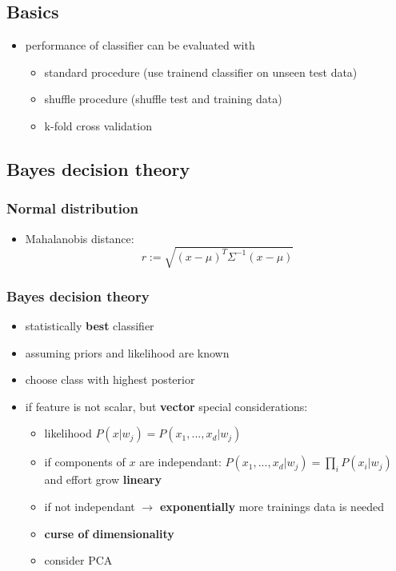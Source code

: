 \documentclass[11pt]{article}
\begin{document}
\subsection{Basics}
\label{sec-9-1}
\begin{itemize}
\item performance of classifier can be evaluated with
\begin{itemize}
\item standard procedure (use trainend classifier on unseen test data)
\item shuffle procedure  (shuffle test and training data)
\item k-fold cross validation
\end{itemize}
\end{itemize}
\subsection{Bayes decision theory}
\label{sec-9-2}
\subsubsection{Normal distribution}
\label{sec-9-2-1}
\begin{itemize}
\item Mahalanobis distance:
      \[ r:= \sqrt{(x-\mu)^T\Sigma^{-1}(x-\mu)} \]
\end{itemize}

\subsubsection{Bayes decision theory}
\label{sec-9-2-2}
\begin{itemize}
\item statistically \textbf{best} classifier
\item assuming priors and likelihood are known
\item choose class with highest posterior
\item if feature is not scalar, but \textbf{vector} special considerations:
\begin{itemize}
\item likelihood $P(x|w_j)=P(x_1,...,x_d|w_j)$
\item if components of $x$ are independant: $P(x_1,...,x_d|w_j)=\prod_i P(x_i|w_j)$
and effort grow \textbf{lineary}
\item if not independant $\rightarrow$ \textbf{exponentially} more trainings data is needed
\item \textbf{curse of dimensionality}
\item consider PCA
\end{itemize}
\end{itemize}
\end{document}
